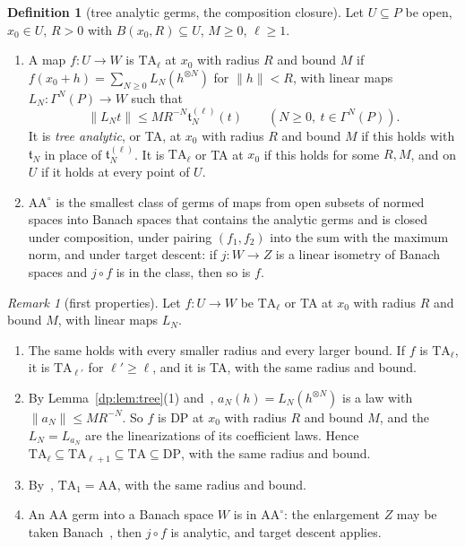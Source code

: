 \documentclass[11pt]{amsart}
\theoremstyle{definition}
\newtheorem{definition}[theorem]{Definition}
\theoremstyle{remark}
\newtheorem{remark}[theorem]{Remark}
\numberwithin{equation}{section}
\newcommand{\norm}[1]{\lVert #1\rVert}
\theoremstyle{plain}
\theoremstyle{definition}
\theoremstyle{plain}
\begin{document}
\begin{definition}[tree analytic germs, the composition closure]\label{dp:def:ta}
Let $U\subseteq P$ be open, $x_0\in U$, $R>0$ with $B(x_0,R)\subseteq U$, $M\ge0$, $\ell\ge1$.
\begin{enumerate}
\item A map $f\colon U\to W$ is $\mathrm{TA}_\ell$ at $x_0$ with radius $R$ and bound $M$ if $f(x_0+h)=\sum_{N\ge0}L_N(h^{\otimes N})$ for $\norm h<R$, with linear maps $L_N\colon\Gamma^N(P)\to W$ such that
\begin{equation}\label{dp:eq:ta-bound}
 \norm{L_Nt}\le MR^{-N}\mathfrak t^{(\ell)}_N(t)\qquad(N\ge0,\ t\in\Gamma^N(P)).
\end{equation}
It is \emph{tree analytic}, or TA, at $x_0$ with radius $R$ and bound $M$ if this holds with $\mathfrak t_N$ in place of $\mathfrak t^{(\ell)}_N$. It is $\mathrm{TA}_\ell$ or TA at $x_0$ if this holds for some $R,M$, and on $U$ if it holds at every point of $U$.
\item $\mathrm{AA}^\circ$ is the smallest class of germs of maps from open subsets of normed spaces into Banach spaces that contains the analytic germs and is closed under composition, under pairing $(f_1,f_2)$ into the sum with the maximum norm, and under target descent: if $j\colon W\to Z$ is a linear isometry of Banach spaces and $j\circ f$ is in the class, then so is $f$.
\end{enumerate}
\end{definition}

\begin{remark}[first properties]\label{dp:rem:ta-basic}
Let $f\colon U\to W$ be $\mathrm{TA}_\ell$ or TA at $x_0$ with radius $R$ and bound $M$, with linear maps $L_N$.
\begin{enumerate}
\item The same holds with every smaller radius and every larger bound. If $f$ is $\mathrm{TA}_\ell$, it is $\mathrm{TA}_{\ell'}$ for $\ell'\ge\ell$, and it is TA, with the same radius and bound.
\item By Lemma~\ref{dp:lem:tree}(1) and~\cite[Lemma~Q.1(2)]{I}, $a_N(h)=L_N(h^{\otimes N})$ is a law with $\norm{a_N}\le MR^{-N}$. So $f$ is DP at $x_0$ with radius $R$ and bound $M$, and the $L_N=L_{a_N}$ are the linearizations of its coefficient laws. Hence $\mathrm{TA}_\ell\subseteq\mathrm{TA}_{\ell+1}\subseteq\mathrm{TA}\subseteq\mathrm{DP}$, with the same radius and bound.
\item By~\cite[Proposition~14.9(1)]{I}, $\mathrm{TA}_1=\mathrm{AA}$, with the same radius and bound.
\item An AA germ into a Banach space $W$ is in $\mathrm{AA}^\circ$: the enlargement $Z$ may be taken Banach~\cite[text after Definition~14.7]{I}, then $j\circ f$ is analytic, and target descent applies.
\end{enumerate}
\end{remark}
\end{document}
